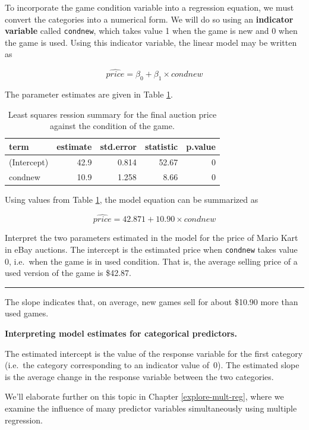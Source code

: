 \documentclass[
  10pt,
  openany]{book}
\theoremstyle{definition}
\theoremstyle{definition}
\theoremstyle{definition}
\theoremstyle{definition}
\theoremstyle{remark}
\begin{document}
To incorporate the game condition variable into a regression equation, we must convert the categories into a numerical form.
We will do so using an \textbf{indicator variable} called \texttt{condnew}, which takes value 1 when the game is new and 0 when the game is used.
Using this indicator variable, the linear model may be written as

\[\widehat{price} = \beta_0 + \beta_1 \times condnew\]

The parameter estimates are given in Table \ref{tab:marioKartNewUsedRegrSummary}.

\begin{table}
\centering
\caption{\label{tab:marioKartNewUsedRegrSummary}Least squares ression summary for the final auction price against the condition of the game.}
\centering
\begin{tabular}[t]{l|r|r|r|r}
\hline
term & estimate & std.error & statistic & p.value\\
\hline
(Intercept) & 42.9 & 0.814 & 52.67 & 0\\
\hline
condnew & 10.9 & 1.258 & 8.66 & 0\\
\hline
\end{tabular}
\end{table}

Using values from Table \ref{tab:marioKartNewUsedRegrSummary}, the model equation can be summarized as

\[\widehat{price} = 42.871 + 10.90 \times condnew\]

Interpret the two parameters estimated in the model for the price of Mario Kart in eBay auctions.
The intercept is the estimated price when \texttt{condnew} takes value 0, i.e.~when the game is in used condition.
That is, the average selling price of a used version of the game is \$42.87.

\begin{center}\rule{0.5\linewidth}{0.5pt}\end{center}

The slope indicates that, on average, new games sell for about \$10.90 more than used games.

\textbf{Interpreting model estimates for categorical predictors.}

The estimated intercept is the value of the response variable for the first category (i.e.~the category corresponding to an indicator value of~0).
The estimated slope is the average change in the response variable between the two categories.

We'll elaborate further on this topic in Chapter \ref{explore-mult-reg}, where we examine the influence of many predictor variables simultaneously using multiple regression.
\end{document}
